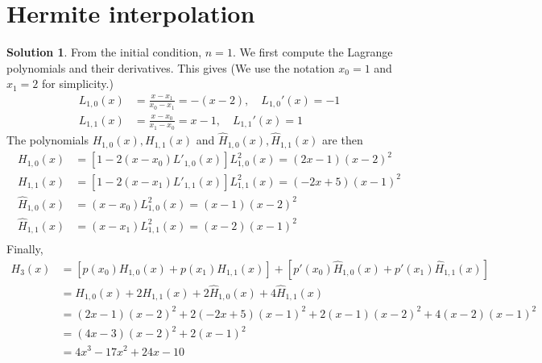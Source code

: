 \documentclass{article}
\theoremstyle{definition}
\newtheorem{solution}{Solution}
\begin{document}
\section{Hermite interpolation}
\begin{solution}
From the initial condition, $n=1$. We first compute the Lagrange polynomials and their derivatives. This gives (We use the notation $x_0=1$ and $x_1=2$ for simplicity.)
\begin{align*}
L_{1,0}(x)&=\frac{x-x_1}{x_0-x_1}=-(x-2),\quad  L_{1,0}'(x)=-1\\
L_{1,1}(x)&=\frac{x-x_0}{x_1-x_0}=x-1,\quad  L_{1,1}'(x)=1
\end{align*}
The polynomials $H_{1,0}(x), H_{1,1}(x)$ and $\hat{H}_{1,0}(x), \hat{H}_{1,1}(x)$ are then
\begin{align*}
H_{1,0}(x)&=[1-2(x-x_0)L'_{1,0}(x)]L_{1,0}^2(x)=(2x-1)(x-2)^2   \\
H_{1,1}(x)&=[1-2(x-x_1)L'_{1,1}(x)]L_{1,1}^2(x)=(-2x+5)(x-1)^2    \\
\hat{H}_{1,0}(x)&=(x-x_0)L_{1,0}^2(x)=(x-1)(x-2)^2    \\
\hat{H}_{1,1}(x)&=(x-x_1)L_{1,1}^2(x)=(x-2)(x-1)^2   \\
\end{align*}
Finally,
\begin{align*}
H_3(x)&=\left[p(x_0)H_{1,0}(x)+p(x_1)H_{1,1}(x)\right]+\left[p'(x_0)\hat{H}_{1,0}(x)+p'(x_1)\hat{H}_{1,1}(x)\right]\\
&=H_{1,0}(x)+2H_{1,1}(x)+2\hat{H}_{1,0}(x)+4\hat{H}_{1,1}(x)\\
&=(2x-1)(x-2)^2+2(-2x+5)(x-1)^2+2(x-1)(x-2)^2+4(x-2)(x-1)^2\\
&=(4x-3)(x-2)^2+2(x-1)^2\\
&=4x^3-17x^2+24x-10
\end{align*}

\end{solution}
\end{document}
